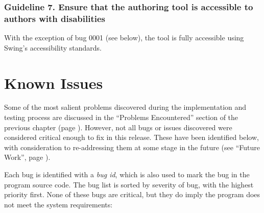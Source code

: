 \subsubsection{Guideline 7. Ensure that the authoring tool is accessible to authors with disabilities}

With the exception of bug 0001 (see below), the tool is fully accessible
using Swing's accessibility standards.

\section{Known Issues}

\label{knownissues}

Some of the most salient problems discovered during the implementation and
testing process are discussed in the ``Problems Encountered'' section of the
previous chapter (page \pageref{problems}). However, not all bugs or issues
discovered were considered critical enough to fix in this release.  These have
been identified below, with consideration to re-addressing them at some stage in
the future (see ``Future Work'', page \pageref{futurework}). 

Each bug is identified with a \emph{bug id}, which is also used to mark the bug
in the program source code. The bug list is sorted by severity of bug, with the
highest priority first. None of these bugs are critical, but they do imply the
program does not meet the system requirements: 

